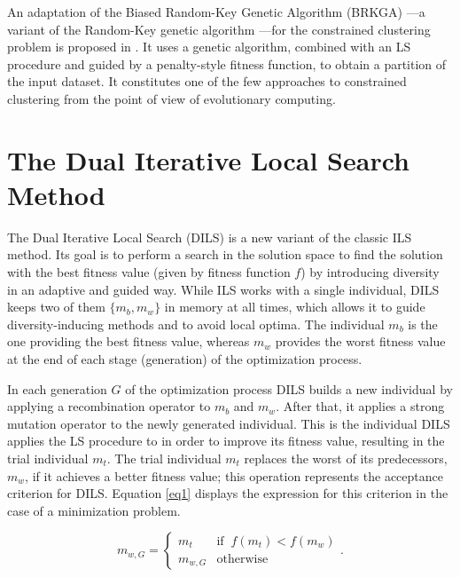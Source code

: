 \documentclass[review]{elsarticle}
\begin{document}
An adaptation of the Biased Random-Key Genetic Algorithm (BRKGA) \cite{gonccalves2011biased}---a variant of the Random-Key genetic algorithm \cite{bean1994genetic}---for the constrained clustering problem is proposed in \cite{de2017comparison}. It uses a genetic algorithm, combined with an LS procedure and guided by a penalty-style fitness function, to obtain a partition of the input dataset. It constitutes one of the few approaches to constrained clustering from the point of view of evolutionary computing.

\clearpage 

\section{The Dual Iterative Local Search Method} \label{sec:DILS}

The Dual Iterative Local Search (DILS) is a new variant of the classic ILS method. Its goal is to perform a search in the solution space to find the solution with the best fitness value (given by fitness function $f$) by introducing diversity in an adaptive and guided way. While ILS works with a single individual, DILS keeps two of them $\{m_b, m_w\}$ in memory at all times, which allows it to guide diversity-inducing methods and to avoid local optima. The individual $m_b$ is the one providing the best fitness value, whereas $m_w$ provides the worst fitness value at the end of each stage (generation) of the optimization process.

In each generation $G$ of the optimization process DILS builds a new individual by applying a recombination operator to $m_b$ and $m_w$. After that, it applies a strong mutation operator to the newly generated individual. This is the individual DILS applies the LS procedure to in order to improve its fitness value, resulting in the trial individual $m_t$. The trial individual $m_t$ replaces the worst of its predecessors, $m_w$, if it achieves a better fitness value; this operation represents the acceptance criterion for DILS. Equation \ref{eq1} displays the expression for this criterion in the case of a minimization problem.

\begin{equation}
m_{w,G} = \left\{ \begin{array}{lc}
m_t &   \text{if} \;\; f(m_t) < f(m_w)\\
m_{w,G} &  \text{otherwise}
\end{array}
\right..
\label{eq1}
\end{equation}
\end{document}
